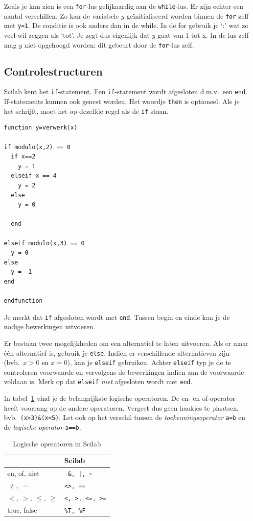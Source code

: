 Zoals je kan zien is een \verb+for+-lus gelijkaardig aan de \verb+while+-lus. Er zijn echter een aantal verschillen. Zo kan de variabele $y$ ge\"initialiseerd worden binnen de \verb+for+ zelf met \verb+y=1+. De conditie is ook anders dan in de while. In de for gebruik je `:' wat zo veel wil zeggen als `tot'. Je zegt dus eigenlijk dat $y$ gaat van 1 tot x. In de lus zelf mag $y$ niet opgehoogd worden: dit gebeurt door de \verb+for+-lus zelf.

\subsection{Controlestructuren}
Scilab kent het \verb+if+-statement. Een \verb+if+-statement wordt afgesloten d.m.v.\ een \verb+end+. If-statements kunnen ook genest worden. Het woordje \verb+then+ is optioneel. Als je het schrijft, moet het op dezelfde regel als de \verb+if+ staan.

\begin{lstlisting}[caption={Geneste if}, label=geneste if]
function y=verwerk(x)

if modulo(x,2) == 0
  if x==2
    y = 1
  elseif x == 4
    y = 2
  else
    y = 0
   
  end
  
elseif modulo(x,3) == 0
  y = 0
else
  y = -1
end

endfunction
\end{lstlisting}

Je merkt dat \verb+if+ afgesloten wordt met \verb+end+. Tussen
begin en einde kan je de nodige bewerkingen uitvoeren.

Er bestaan twee mogelijkheden om een alternatief te laten
uitvoeren. Als er maar \'e\'en alternatief is, gebruik je
\verb+else+. Indien er verschillende alternatieven zijn (bvb.\  $x>0$ en $x=0$), kan je \verb+elseif+ gebruiken.
Achter \verb+elseif+ typ je de te controleren voorwaarde en
vervolgens de bewerkingen indien aan de voorwaarde voldaan is.
Merk op dat \verb+elseif+ \emph{niet} afgesloten wordt met
\verb+end+.

In tabel~\ref{operatoren-scilab} vind je de belangrijkste logische
operatoren. De {\sc en}- en {\sc of}-operator heeft voorrang op de andere operatoren. Vergeet dus geen haakjes te plaatsen, bvb.\ \verb/(x>3)&(x<5)/. Let ook op het verschil tussen de \emph{toekenningsoperator} \verb+a=b+ en de \emph{logische operator} \verb+a==b+.

\begin{table}[htbp]
\centering
\caption{Logische operatoren in Scilab}
\begin{tabular}{ll}
\toprule

             & Scilab \\ 
\midrule
{\sc en, of, niet} &\verb/ &, |, ~/ \\ 
$\neq,~=$ & \verb/<>, ==/ \\ 
$<,~>,~\leq,~\geq$    & \verb/<, >, <=, >=/ \\ 
{\sc true, false}&\verb+%T, %F+\\ 
\bottomrule
\end{tabular}
 \label{operatoren-scilab}
\end{table}




